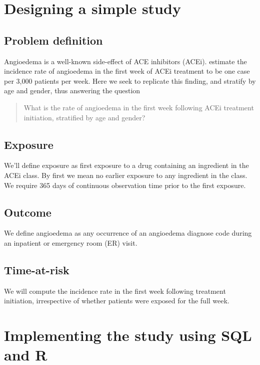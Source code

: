 \documentclass[11pt]{book}
\begin{document}
\section{Designing a simple study}\label{designing-a-simple-study}

\subsection{Problem definition}\label{problem-definition}

Angioedema is a well-known side-effect of ACE inhibitors (ACEi).
\citet{slater_1988} estimate the incidence rate of angioedema in the
first week of ACEi treatment to be one case per 3,000 patients per week.
Here we seek to replicate this finding, and stratify by age and gender,
thus answering the question

\begin{quote}
What is the rate of angioedema in the first week following ACEi
treatment initiation, stratified by age and gender?
\end{quote}

\subsection{Exposure}\label{exposure}

We'll define exposure as first exposure to a drug containing an
ingredient in the ACEi class. By first we mean no earlier exposure to
any ingredient in the class. We require 365 days of continuous
observation time prior to the first exposure.

\subsection{Outcome}\label{outcome}

We define angioedema as any occurrence of an angioedema diagnose code
during an inpatient or emergency room (ER) visit.

\subsection{Time-at-risk}\label{time-at-risk}

We will compute the incidence rate in the first week following treatment
initiation, irrespective of whether patients were exposed for the full
week.

\section{Implementing the study using SQL and
R}\label{implementing-the-study-using-sql-and-r}
\end{document}
